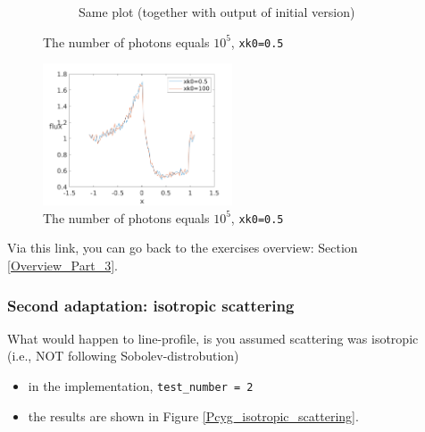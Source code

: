 \documentclass[../main/main.tex]{subfiles}
\begin{document}
\begin{figure}[!htbp]
\begin{subfigure}{.5\textwidth}
\caption{Same plot (together with output of initial version)}
\end{subfigure}
\caption{The number of photons equals $10^{5}$, \texttt{xk0=0.5}}
\label{PCyg_mu_eq_1xk0_05}
\end{figure}

\begin{figure}[!htbp]
\centering
\includegraphics[width=0.5\textwidth]{../../introductory_exercises/P_Cygni_profile_UV_resonance/data/npot5xk05alpha0beta1test11.png}
\caption{The number of photons equals $10^{5}$, \texttt{xk0=0.5}}
\label{PCyg_mu_eq_xk0_05_vs_100}
\end{figure}

Via this link, you can go back to the exercises overview: Section \underline{\ref{Overview_Part_3}}.


\newpage
\subsubsection{Second adaptation: isotropic scattering}
\label{isotropic_scattering}
What would happen to line-profile, is you assumed scattering
was isotropic 
\\(i.e., NOT following Sobolev-distrobution)

\begin{itemize}
\item in the implementation, \texttt{test\_number = 2}
\item the results are shown in Figure \ref{Pcyg_isotropic_scattering}.
\end{itemize}
\end{document}
